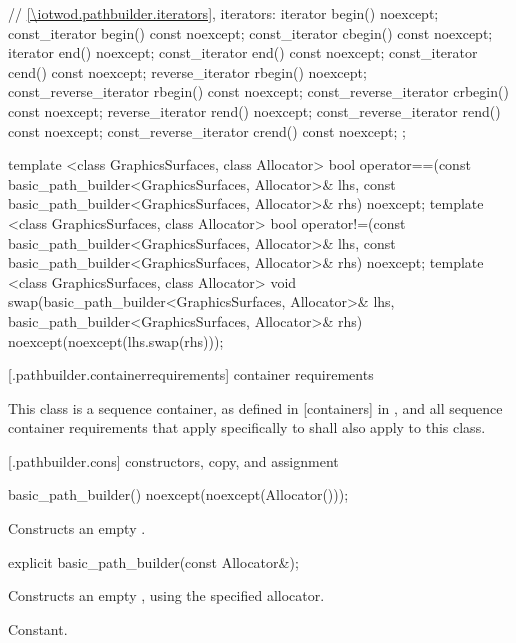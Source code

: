 \begin{codeblock}
{{    // \ref{\iotwod.pathbuilder.iterators}, iterators:
    iterator begin() noexcept;
    const_iterator begin() const noexcept;
    const_iterator cbegin() const noexcept;
    iterator end() noexcept;
    const_iterator end() const noexcept;
    const_iterator cend() const noexcept;
    reverse_iterator rbegin() noexcept;
    const_reverse_iterator rbegin() const noexcept;
    const_reverse_iterator crbegin() const noexcept;
    reverse_iterator rend() noexcept;
    const_reverse_iterator rend() const noexcept;
    const_reverse_iterator crend() const noexcept;
  };

  template <class GraphicsSurfaces, class Allocator>
  bool operator==(const basic_path_builder<GraphicsSurfaces, Allocator>& lhs,
    const basic_path_builder<GraphicsSurfaces, Allocator>& rhs) noexcept;
  template <class GraphicsSurfaces, class Allocator>
  bool operator!=(const basic_path_builder<GraphicsSurfaces, Allocator>& lhs,
    const basic_path_builder<GraphicsSurfaces, Allocator>& rhs) noexcept;
  template <class GraphicsSurfaces, class Allocator>
  void swap(basic_path_builder<GraphicsSurfaces, Allocator>& lhs,
    basic_path_builder<GraphicsSurfaces, Allocator>& rhs) noexcept(noexcept(lhs.swap(rhs)));
}
\end{codeblock}

 [\iotwod.pathbuilder.containerrequirements] { container requirements}

\pnum
This class is a sequence container, as defined in [containers] in \CppXVII, and all sequence container requirements that apply specifically to  shall also apply to this class.

 [\iotwod.pathbuilder.cons] { constructors, copy, and assignment}

%
\begin{itemdecl}
basic_path_builder() noexcept(noexcept(Allocator()));
\end{itemdecl}
\begin{itemdescr}
\pnum
\effects
Constructs an empty .
\end{itemdescr}
	
%
\begin{itemdecl}
explicit basic_path_builder(const Allocator&);
\end{itemdecl}
\begin{itemdescr}
\pnum
\effects
Constructs an empty , using the specified allocator.

\pnum
\complexity
Constant.
\end{itemdescr}

